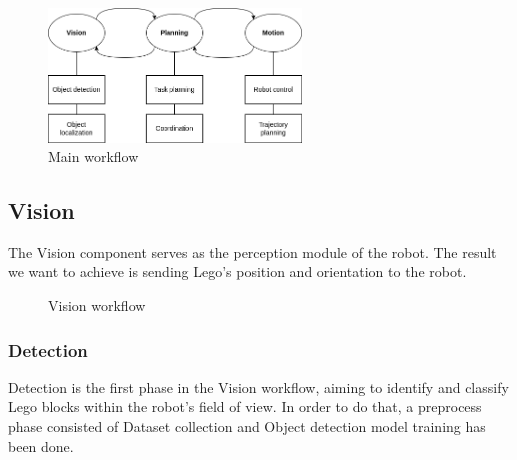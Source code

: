 \documentclass{article}
\begin{document}
	\begin{figure}[H]
		\centering
		\includegraphics[width=0.6\textwidth]{images/design-main.png}
		\caption{Main workflow}
		\label{fig:design-main}
	\end{figure}
	
	\subsection{Vision}
	The Vision component serves as the perception module of the robot. The result we want to achieve is sending Lego's position and orientation to the robot.
	
	\begin{figure}[H]
		\centering
		\caption{Vision workflow}
		\label{fig:design-vision}
	\end{figure}
	
	\subsubsection{Detection}
	Detection is the first phase in the Vision workflow, aiming to identify and classify Lego blocks within the robot's field of view. In order to do that, a preprocess phase consisted of Dataset collection and Object detection model training has been done.
	
\end{document}
